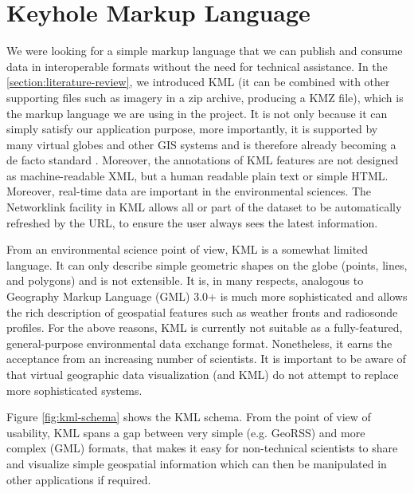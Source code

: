 \section{Keyhole Markup Language}

We were looking for a simple markup language that we can publish and consume data  in interoperable formats without the need for technical assistance. In the \ref{section:literature-review}, we introduced KML (it can be combined with other supporting files such as imagery in a zip archive, producing a KMZ file), which is the markup language we are using in the project. It is not only because it can simply satisfy our application purpose, more importantly, it is supported by many virtual globes and other GIS systems and is therefore already becoming a de facto standard \cite{blower.sharing-visualizing.2007}. Moreover, the annotations of KML features are not designed as machine-readable XML, but a human readable plain text or simple HTML. Moreover, real-time data are important in the environmental sciences. The Networklink facility in KML allows all or part of the dataset to be automatically refreshed by the URL, to ensure the user always sees the latest information.

From an environmental science point of view, KML is a somewhat limited language. It can only describe simple geometric shapes on the globe (points, lines, and polygons) and is not extensible. It is, in many respects, analogous to Geography Markup Language (GML) 3.0+ is much more sophisticated and allows the rich description of geospatial features such as weather fronts and radiosonde profiles. For the above reasons, KML is currently not suitable as a fully-featured, general-purpose environmental data exchange format. Nonetheless, it earns the acceptance from an increasing number of scientists. It is important to be aware of that virtual geographic data visualization (and KML) do not attempt to replace more sophisticated systems. 

Figure \ref{fig:kml-schema} shows the KML schema. From the point of view of usability, KML spans a gap between very simple (e.g. GeoRSS) and more complex (GML) formats, that makes it easy for non-technical scientists to share and visualize simple geospatial information which can then be manipulated in other applications if required. 

